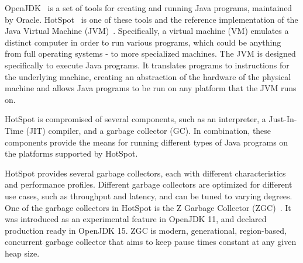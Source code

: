 
OpenJDK~\cite{openjdk} is a set of tools for creating and running Java programs, maintained by Oracle. HotSpot~\cite{hotspot} is one of these tools and the reference implementation of the Java Virtual Machine (JVM)~\cite{JVM}. Specifically, a virtual machine (VM) emulates a distinct computer in order to run various programs, which could be anything from full operating systems - to more specialized machines. The JVM is designed specifically to execute Java programs. It translates programs to instructions for the underlying machine, creating an abstraction of the hardware of the physical machine and allows Java programs to be run on any platform that the JVM runs on.

HotSpot is compromised of several components, such as an interpreter, a Just-In-Time (JIT) compiler, and a garbage collector (GC). In combination, these components provide the means for running different types of Java programs on the platforms supported by HotSpot.

HotSpot provides several garbage collectors, each with different characteristics and performance profiles. Different garbage collectors are optimized for different use cases, such as throughput and latency, and can be tuned to varying degrees. One of the garbage collectors in HotSpot is the Z Garbage Collector (ZGC)~\cite{zgc}. It was introduced as an experimental feature in OpenJDK 11, and declared production ready in OpenJDK 15. ZGC is modern, generational, region-based, concurrent garbage collector that aims to keep pause times constant at any given heap size.


